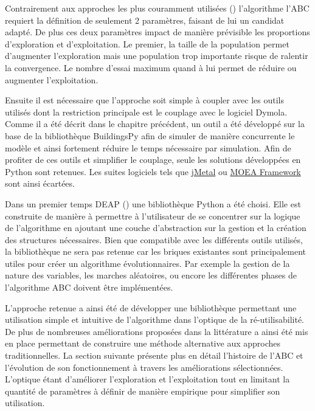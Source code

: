 Contrairement aux approches les plus couramment utilisées ()
l’algorithme l’ABC requiert la définition de seulement 2
paramètres, faisant de lui un candidat adapté. De plus ces deux paramètres impact
de manière prévisible les proportions d’exploration et d’exploitation. Le premier,
la taille de la population permet d’augmenter l’exploration mais une population
trop importante risque de ralentir la convergence. Le nombre d’essai maximum quand
à lui permet de réduire ou augmenter l’exploitation.

Ensuite il est nécessaire que l’approche soit simple à coupler avec les outils
utilisés dont la restriction principale est le couplage avec le logiciel Dymola.
Comme il a été décrit dans le chapitre précédent, un outil a été développé sur la
base de la bibliothèque BuildingsPy afin de simuler de manière concurrente le modèle
et ainsi fortement réduire le temps nécessaire par simulation.
Afin de profiter de ces outils et simplifier le couplage, seule les solutions
développées en Python sont retenues. Les suites logiciels tels que
\href{http://jmetal.sourceforge.net/index.html}{jMetal} ou
\href{http://moeaframework.org/index.html}{MOEA Framework} sont ainsi écartées.

Dans un premier temps DEAP () une bibliothèque Python a été
choisi. Elle est construite de manière à permettre à l’utilisateur de se concentrer sur la
logique de l’algorithme en ajoutant une couche d’abstraction sur la gestion et la
création des structures nécessaires.
Bien que compatible avec les différents outils utilisés, la bibliothèque ne sera
pas retenue car les briques existantes sont principalement utiles pour créer un
algorithme évolutionnaires. Par exemple la gestion de la nature des variables,
les marches aléatoires, ou encore les différentes phases de l’algorithme ABC
doivent être implémentées.

L’approche retenue a ainsi été de développer une bibliothèque permettant une utilisation
simple et intuitive de l’algorithme dans l’optique de la ré-utilisabilité. De plus
de nombreuses améliorations proposées dans la littérature a ainsi été mis en place
permettant de construire une méthode alternative aux approches traditionnelles.
La section suivante présente plus en détail l’histoire de l’ABC et l’évolution de
son fonctionnement à travers les améliorations sélectionnées.
L’optique étant d’améliorer l’exploration et l’exploitation tout en limitant la quantité
de paramètres à définir de manière empirique pour simplifier son utilisation.



